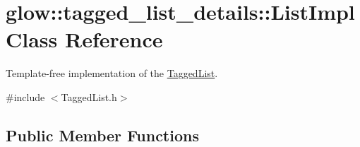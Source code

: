 \hypertarget{classglow_1_1tagged__list__details_1_1_list_impl}{}\section{glow\+:\+:tagged\+\_\+list\+\_\+details\+:\+:List\+Impl Class Reference}
\label{classglow_1_1tagged__list__details_1_1_list_impl}


Template-\/free implementation of the {\ttfamily \hyperlink{classglow_1_1_tagged_list}{Tagged\+List}}.  




{\ttfamily \#include $<$Tagged\+List.\+h$>$}

\subsection*{Public Member Functions}
